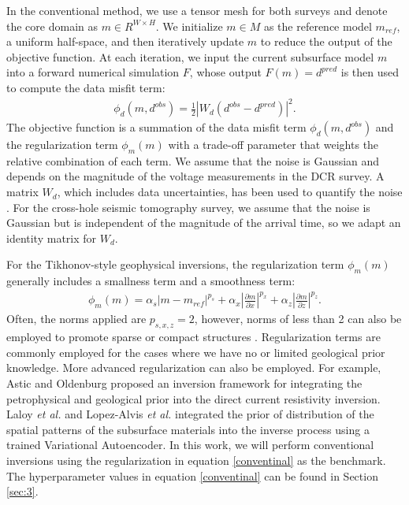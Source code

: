 \documentclass[lettersize,journal]{IEEEtran}
\begin{document}
In the conventional method, we use a tensor mesh for both surveys and denote the core domain as $m \in R^{W \times H}$. We initialize $m \in M$ as the reference model $m_{ref}$, a uniform half-space, and then iteratively update $m$ to reduce the output of the objective function. At each iteration, we input the current subsurface model $m$ into a forward numerical simulation $F$, whose output $F(m) = d^{pred}$ is then used to compute the data misfit term:
\begin{equation}
\begin{aligned}
\phi_{d}(m, d^{obs}) = \frac{1}{2}|W_d(d^{obs} - d^{pred})|^2.
\end{aligned}
\end{equation}
The objective function is a summation of the data misfit term $\phi_{d}(m, d^{obs})$ and the regularization term $\phi_{m}(m)$ with a trade-off parameter that weights the relative combination of each term. We assume that the noise is Gaussian and depends on the magnitude of the voltage measurements in the DCR survey. A matrix $W_d$, which includes data uncertainties, has been used to quantify the noise \cite{ref47}. For the cross-hole seismic tomography survey, we assume that the noise is Gaussian but is independent of the magnitude of the arrival time, so we adapt an identity matrix for $W_d$.

For the Tikhonov-style geophysical inversions, the regularization term $\phi_{m}(m)$ generally includes a smallness term and a smoothness term:
\begin{equation}
\label{conventinal}
\begin{aligned}
\phi_{m}(m) = \alpha_s|m-m_{ref}|^{p_s} + \alpha_x|\frac{\partial m}{\partial x}|^{p_x}+ \alpha_z|\frac{\partial m}{\partial z}|^{p_z}.
\end{aligned}
\end{equation}
Often, the norms applied are $p_{s,x,z}=2$, however, norms of less than 2 can also be employed to promote sparse or compact structures \cite{fournier_inversion_2019}. Regularization terms are commonly employed for the cases where we have no or limited geological prior knowledge. More advanced regularization can also be employed. For example, Astic and Oldenburg \cite{astic_framework_2019} proposed an inversion framework for integrating the petrophysical and geological prior into the direct current resistivity inversion. Laloy \textit{et al.} \cite{ref8} and Lopez-Alvis \textit{et al.} \cite{https://doi.org/10.1029/2021JB022581} integrated the prior of distribution of the spatial patterns of the subsurface materials into the inverse process using a trained Variational Autoencoder. In this work, we will perform conventional inversions using the regularization in equation \ref{conventinal} as the benchmark. The hyperparameter values in equation \ref{conventinal} can be found in Section \ref{sec:3}.
\end{document}

